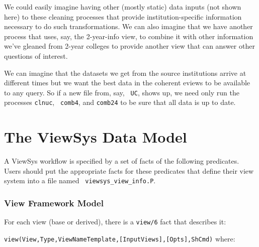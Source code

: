 We could easily imagine having other (mostly static) data inputs (not
shown here) to these cleaning processes that provide
institution-specific information necessary to do such transformations.
We can also imagine that we have another process that uses, say, the
2-year-info view, to combine it with other information we've gleaned
from 2-year colleges to provide another view that can answer other
questions of interest.

We can imagine that the datasets we get from the source institutions
arrive at different times but we want the best data in the coherent
eviews to be available to any query.  So if a new file from, say, {\tt
  UC}, shows up, we need only run the processes {\tt clnuc}, {\tt
  comb4}, and {\tt comb24} to be sure that all data is up to date.

\section{The ViewSys Data Model}

A ViewSys workflow is specified by a set of facts of the following
predicates.  Users should put the appropriate facts for these
predicates that define their view system into a file named {\tt
  viewsys\_view\_info.P}.

\subsubsection{View Framework Model}

For each view (base or derived), there is a {\tt view/6} fact that
describes it:

{\tt view(View,Type,ViewNameTemplate,[InputViews],[Opts],ShCmd)}
\noindent
where:


